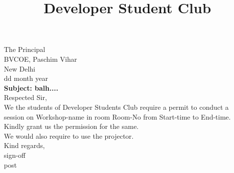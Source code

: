 \documentclass[12pt,a4paper]{article} %
\title{Developer Student Club}
\begin{document}
	
	
	\date{}
	\maketitle
	\hspace{-8mm}
	The Principal \\
	BVCOE, Paschim Vihar\\
	New Delhi\\
	\linebreak
	dd month year\\
	\linebreak
	\textbf{Subject: balh....}\\
	\linebreak
	Respected Sir,\\
	
	\vspace{-5mm}
	\hspace{8mm}
	We the students of Developer Students Club require a permit to conduct a session on 
	Workshop-name 
	in room
	Room-No
	from 
	Start-time 
	to 
	End-time.\\
	Kindly grant us the permission for the same. \\
	We would also require to use the projector.\\
	\linebreak
	Kind regards,\\
	sign-off\\
	post 
	
\end{document}
